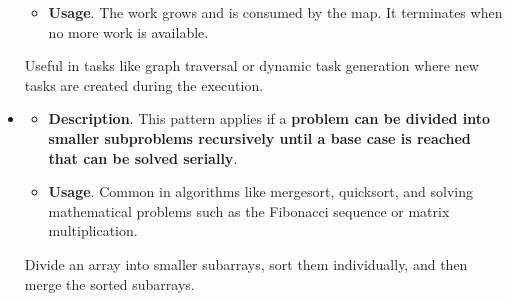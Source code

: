 \begin{itemize}
\begin{itemize}
        \item[\textcolor{Green3}{\faIcon{question}}] \textcolor{Green3}{\textbf{Usage}}. The work grows and is consumed by the map. It terminates when no more work is available.
    \end{itemize}
    \begin{examplebox}
        Useful in tasks like graph traversal or dynamic task generation where new tasks are created during the execution.
    \end{examplebox}


    \item {}
    \begin{itemize}
        \item[\textcolor{Red2}{\faIcon{book}}] \textcolor{Red2}{\textbf{Description}}. This pattern applies if a \textbf{problem can be divided into smaller subproblems recursively until a base case is reached that can be solved serially}.

        \item[\textcolor{Green3}{\faIcon{question}}] \textcolor{Green3}{\textbf{Usage}}. Common in algorithms like mergesort, quicksort, and solving mathematical problems such as the Fibonacci sequence or matrix multiplication.
    \end{itemize}
    \begin{examplebox}
        Divide an array into smaller subarrays, sort them individually, and then merge the sorted subarrays.
    \end{examplebox}
\end{itemize}
